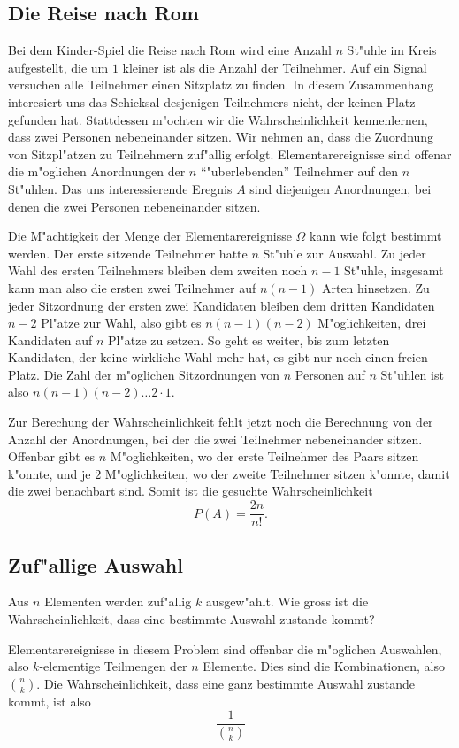 \subsection{Die Reise nach Rom}
Bei dem Kinder-Spiel die Reise nach Rom wird eine Anzahl $n$ St"uhle
im Kreis
aufgestellt, die um $1$ kleiner ist als die Anzahl der Teilnehmer.
Auf ein Signal versuchen alle Teilnehmer einen Sitzplatz zu
finden. In diesem Zusammenhang interesiert uns das Schicksal
desjenigen Teilnehmers nicht, der keinen Platz gefunden hat.
Stattdessen m"ochten wir die Wahrscheinlichkeit kennenlernen,
dass zwei Personen nebeneinander sitzen. Wir nehmen an, dass 
die Zuordnung von Sitzpl"atzen zu Teilnehmern zuf"allig erfolgt.
Elementarereignisse sind offenar die m"oglichen Anordnungen der
$n$ ``"uberlebenden'' Teilnehmer auf den $n$ St"uhlen. Das uns
interessierende Eregnis $A$ sind diejenigen Anordnungen, bei denen die
zwei Personen nebeneinander sitzen.

Die M"achtigkeit der Menge der Elementarereignisse $\Omega$ kann
wie folgt bestimmt werden. Der erste sitzende Teilnehmer hatte
$n$ St"uhle zur Auswahl. Zu jeder Wahl des ersten Teilnehmers bleiben
dem zweiten noch $n-1$ St"uhle, insgesamt kann man also die ersten
zwei Teilnehmer auf $n(n-1)$ Arten hinsetzen. Zu jeder Sitzordnung
der ersten zwei Kandidaten bleiben dem dritten Kandidaten $n-2$ Pl"atze
zur Wahl, also gibt es $n(n-1)(n-2)$ M"oglichkeiten, drei Kandidaten
auf $n$ Pl"atze zu setzen. So geht es weiter, bis zum
letzten Kandidaten, der keine wirkliche Wahl mehr hat, es gibt nur noch einen
freien Platz. Die Zahl der m"oglichen Sitzordnungen von $n$ Personen
auf $n$ St"uhlen ist also $n(n-1)(n-2)\dots 2\cdot 1$.

Zur Berechung der Wahrscheinlichkeit fehlt jetzt noch die Berechnung
von der Anzahl der Anordnungen, bei der die zwei Teilnehmer nebeneinander
sitzen. Offenbar gibt es $n$ M"oglichkeiten, wo der erste Teilnehmer
des Paars sitzen k"onnte, und je $2$ M"oglichkeiten, wo der zweite
Teilnehmer sitzen k"onnte, damit die zwei benachbart sind. Somit ist
die gesuchte Wahrscheinlichkeit
\[
P(A)=\frac{2n}{n!}.
\]

\subsection{Zuf"allige Auswahl}
Aus $n$ Elementen werden zuf"allig $k$ ausgew"ahlt. Wie gross ist die
Wahrscheinlichkeit, dass eine bestimmte Auswahl zustande kommt?

Elementarereignisse in diesem Problem sind offenbar die m"oglichen
Auswahlen, also $k$-elementige Teilmengen der $n$ Elemente. 
Dies sind die Kombinationen, also $\binom{n}k$. Die Wahrscheinlichkeit,
dass eine ganz bestimmte Auswahl zustande kommt, ist also 
\[
\frac1{\binom{n}k}
\]

